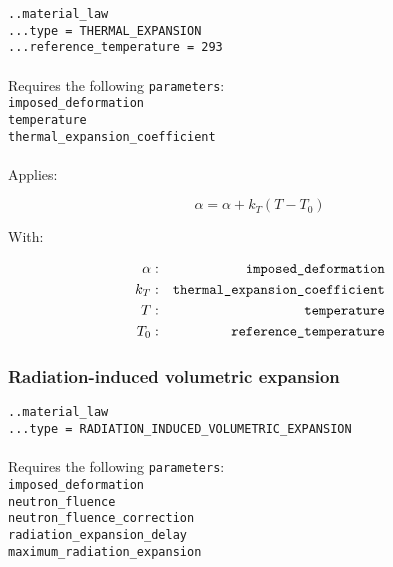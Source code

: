 \documentclass[10pt]{article}
\begin{document}
\noindent \verb+..material_law+\\
\verb+...type = THERMAL_EXPANSION+\\
\verb+...reference_temperature = 293+

\paragraph{}Requires the following \verb+parameters+:\\

\noindent \verb+imposed_deformation+\\
\verb+temperature+\\
\verb+thermal_expansion_coefficient+

\paragraph{}Applies:

\begin{equation}
	\alpha = \alpha + k_T ( T - T_0 )
\end{equation}

With:

\begin{eqnarray}
	\alpha & : & \verb+imposed_deformation+ \notag \\
	k_T & : & \verb+thermal_expansion_coefficient+\notag  \\
	T & : & \verb+temperature+ \notag \\
	T_0 & : & \verb+reference_temperature+ \notag 
\end{eqnarray}

\subsubsection{Radiation-induced volumetric expansion}

\noindent \verb+..material_law+\\
\verb+...type = RADIATION_INDUCED_VOLUMETRIC_EXPANSION+

\paragraph{}Requires the following \verb+parameters+:\\

\noindent \verb+imposed_deformation+\\
\verb+neutron_fluence+\\
\verb+neutron_fluence_correction+\\
\verb+radiation_expansion_delay+\\
\verb+maximum_radiation_expansion+\\
\end{document}

